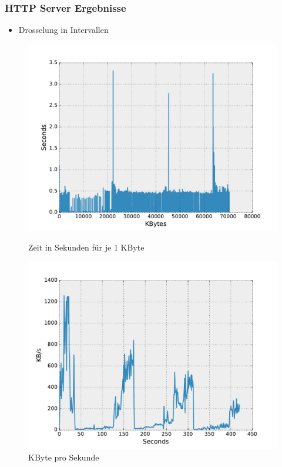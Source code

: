 \documentclass[handout]{beamer}
\begin{document}
\begin{frame}
\frametitle{HTTP Server Ergebnisse}
\begin{itemize}
\item Drosselung in Intervallen
\end{itemize}

\begin{figure}
\centering
\begin{minipage}[t]{0.4\linewidth}
			\centering
			\includegraphics[width=\linewidth]{images/seconds_http.pdf}
			\caption{Zeit in Sekunden für je 1 KByte}
\end{minipage}
\begin{minipage}[t]{0.4\linewidth}
			\centering
			\includegraphics[width=\linewidth]{images/datarate_http.pdf}
			\caption{KByte pro Sekunde}
\end{minipage}
\end{figure}
\end{frame}
\end{document}
